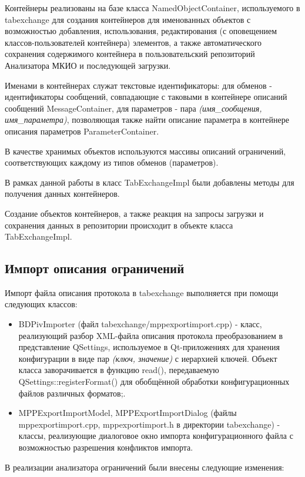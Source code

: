 Контейнеры реализованы на базе класса NamedObjectContainer, используемого в 
tabexchange для создания контейнеров для именованных объектов с возможностью 
добавления, использования, редактирования (с оповещением классов-пользователей 
контейнера) элементов, а также автоматического сохранения содержимого 
контейнера в пользовательский репозиторий Анализатора МКИО и последующей 
загрузки.

Именами в контейнерах служат текстовые идентификаторы: для обменов - 
идентификаторы сообщений, совпадающие с таковыми в контейнере описаний 
сообщений MessageContainer, для параметров - пара \textit{(имя\_сообщения, 
имя\_параметра)}, позволяющая также найти описание параметра в 
контейнере описания параметров ParameterContainer.

В качестве хранимых объектов используются массивы описаний ограничений, 
соответствующих каждому из типов обменов (параметров).

В рамках данной работы в класс TabExchangeImpl были добавлены методы для 
получения данных контейнеров.

Создание объектов контейнеров, а также реакция на запросы загрузки и сохранения 
данных в репозитории происходит в объекте класса TabExchangeImpl.

\subsection*{Импорт описания ограничений}

Импорт файла описания протокола в tabexchange выполняется при помощи следующих 
классов:

\begin{itemize}
 \item BDPivImporter (файл tabexchange/mppexportimport.cpp) - класс, 
реализующий разбор XML-файла описания протокола преобразованием в представление 
QSettings, используемое в Qt-приложениях для хранения конфигурации в виде пар 
\textit{(ключ, значение)} с иерархией ключей. Объект класса заворачивается в 
функцию read(), передаваемую QSettings::registerFormat() для обобщённой 
обработки конфигурационных файлов различных форматов;.
 \item MPPExportImportModel, MPPExportImportDialog (файлы 
mppexportimport.cpp, mppexportimport.h в директории tabexchange) - классы, 
реализующие диалоговое окно импорта конфигурационного файла с возможностью 
разрешения конфликтов импорта.
\end{itemize}

В реализации анализатора ограничений были внесены следующие изменения:

